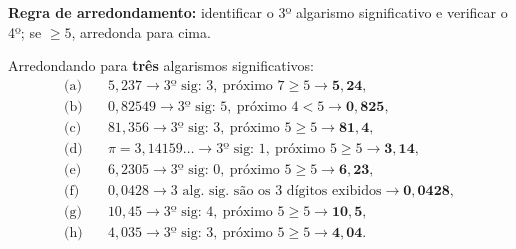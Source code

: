 \textbf{Regra de arredondamento:} identificar o 3º algarismo significativo e verificar o 4º; se $\geq5$, arredonda para cima.

Arredondando para \textbf{três} algarismos significativos:
\begin{align*}
\text{(a)}&\quad 5{,}237 \to \text{3º sig: }3,\ \text{próximo }7\geq5 \to \mathbf{5{,}24},\\
\text{(b)}&\quad 0{,}82549 \to \text{3º sig: }5,\ \text{próximo }4<5 \to \mathbf{0{,}825},\\
\text{(c)}&\quad 81{,}356 \to \text{3º sig: }3,\ \text{próximo }5\geq5 \to \mathbf{81{,}4},\\
\text{(d)}&\quad \pi=3{,}14159\ldots \to \text{3º sig: }1,\ \text{próximo }5\geq5 \to \mathbf{3{,}14},\\
\text{(e)}&\quad 6{,}2305 \to \text{3º sig: }0,\ \text{próximo }5\geq5 \to \mathbf{6{,}23},\\
\text{(f)}&\quad 0{,}0428 \to \text{3 alg. sig. são os 3 dígitos exibidos} \to \mathbf{0{,}0428},\\
\text{(g)}&\quad 10{,}45 \to \text{3º sig: }4,\ \text{próximo }5\geq5 \to \mathbf{10{,}5},\\
\text{(h)}&\quad 4{,}035 \to \text{3º sig: }3,\ \text{próximo }5\geq5 \to \mathbf{4{,}04}.
\end{align*}